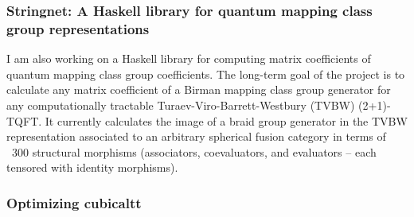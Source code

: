 \documentclass[12pt]{article}
\theoremstyle{plain} \numberwithin{equation}{section}
\theoremstyle{definition}
\begin{document}
\subsubsection{Stringnet: A Haskell library for quantum mapping class group representations}
I am also working on a Haskell library for computing matrix coefficients of quantum mapping class group coefficients.  The long-term goal of the project is to calculate any matrix coefficient of a Birman mapping class group generator for any computationally tractable Turaev-Viro-Barrett-Westbury (TVBW) (2+1)-TQFT.   It currently calculates the image of a braid group generator in the TVBW representation associated to an arbitrary spherical fusion category in terms of ~300 structural morphisms (associators, coevaluators, and evaluators -- each tensored with identity morphisms).   

\subsubsection{Optimizing cubicaltt}
\end{document}
